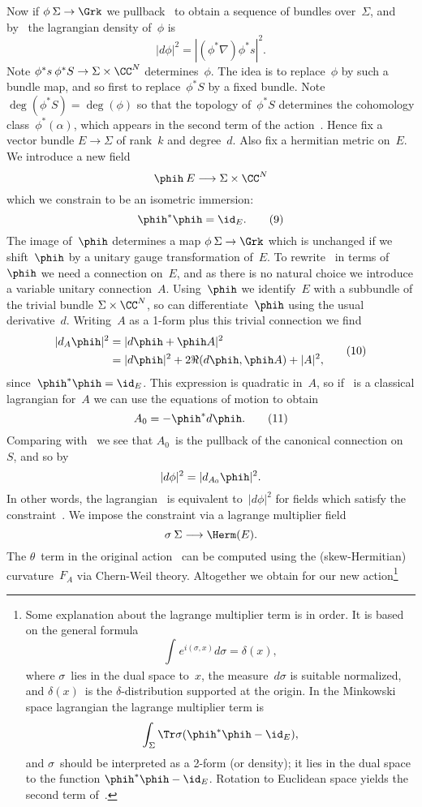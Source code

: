 Now if $\phi \:\Sigma \to\Grk$ we pullback~ to obtain a sequence of
bundles over~$\Sigma $, and by~ the lagrangian density of~$\phi$ is
  $$ |d\phi |^2 = |(\phi ^*\nabla )\phi ^*s|^2. \tag{8} $$
Note $\phi ^*s\:\phi ^*S\to\Sigma \times \CC^N$ determines~$\phi $.  The idea
is to replace~$\phi $ by such a bundle map, and so first to replace~$\phi
^*S$ by a fixed bundle.  Note $\deg(\phi ^*S)=\deg(\phi )$ so that the
topology of~$\phi ^*S$ determines the cohomology class~$\phi ^*(\alpha )$,
which appears in the second term of the action~.  Hence fix a
vector bundle $E\to\Sigma $ of rank~$k$ and degree~$d$.  Also fix a hermitian
metric on~$E$.  We introduce a new field 
  $$ \phih\:E\longrightarrow \Sigma \times \CC^N  $$
which we constrain to be an isometric immersion: 
  $$ \phih^*\phih=\id_E. \tag{9} $$ 
The image of~$\phih$ determines a map $\phi \:\Sigma \to\Grk$ which is
unchanged if we shift~$\phih$ by a unitary gauge transformation of~$E$.  To
rewrite~ in terms of~$\phih$ we need a connection on~$E$, and as
there is no natural choice we introduce a variable unitary connection~$A$.
Using~$\phih$ we identify~$E$ with a subbundle of the trivial bundle $\Sigma
\times \CC^N$, so can differentiate~$\phih$ using the usual derivative~$d$.
Writing~$A$ as a 1-form plus this trivial connection we find
  $$ \aligned
      |d_A\phih|^2 &= |d\phih + \phih A|^2 \\ 
      &= |d\phih|^2 + 2\Re(d\phih,\phih A) + |A|^2,\endaligned \tag{10} $$
since~$\phih^*\phih=\id_E$.  This expression is quadratic in~$A$, so if
~is a classical lagrangian for~$A$ we can use the equations of
motion to obtain
  $$ A_0 = - \phih^*d\phih. \tag{11} $$
Comparing with~ we see that $A_0$~is the pullback of the canonical
connection on~$S$, and so by~ 
  $$ |d\phi |^2 = |d_{A_0}\phih|^2.  $$
In other words, the lagrangian~ is equivalent to~$|d\phi |^2$ for
fields which satisfy the constraint~.  We impose the constraint
via a lagrange multiplier field
  $$ \sigma \:\Sigma \longrightarrow \Herm(E). $$ 
The $\theta $~term in the original action~ can be computed using
the (skew-Hermitian) curvature~$F_A$ via Chern-Weil theory.  Altogether we
obtain for our new action\footnote{Some explanation about the lagrange
multiplier term is in order.  It is based on the general formula
  $$ \int_{}e^{i(\sigma ,x)}d\sigma  = \delta (x), $$ 
where $\sigma $~lies in the dual space to~$x$, the measure~$d\sigma $ is
suitable normalized, and $\delta (x)$~is the $\delta $-distribution
supported at the origin.  In the Minkowski space lagrangian the lagrange
multiplier term is 
  $$ \int_{\Sigma }\Tr \sigma (\phih^*\phih - \id_E), $$ 
and $\sigma $~should be interpreted as a 2-form (or density);  it lies in the
dual space to the function $\phih^*\phih-\id_E$.  Rotation to Euclidean space
yields the second term of~.} 
